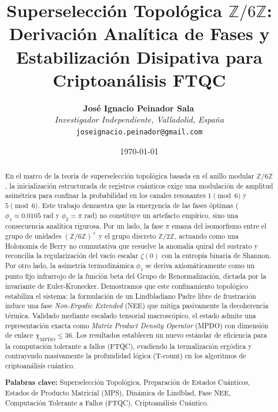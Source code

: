 \documentclass[12pt,a4paper]{article}
\theoremstyle{plain}
\theoremstyle{definition}
\theoremstyle{remark}
\begin{document}
\title{Superselección Topológica $\mathbb{Z}/6\mathbb{Z}$: Derivación Analítica de Fases y Estabilización Disipativa para Criptoanálisis FTQC}

\author{
  \textbf{José Ignacio Peinador Sala}\, \\
  \textit{Investigador Independiente, Valladolid, España} \\
  \texttt{joseignacio.peinador@gmail.com}
}

\date{\today}
\maketitle

\begin{abstract}
En el marco de la teoría de superselección topológica basada en el anillo modular $\mathbb{Z}/6\mathbb{Z}$, la inicialización estructurada de registros cuánticos exige una modulación de amplitud asimétrica para confinar la probabilidad en los canales resonantes $1 \pmod 6$ y $5 \pmod 6$. Este trabajo demuestra que la emergencia de las fases óptimas ($\phi_1 \approx 0.0105$ rad y $\phi_2 = \pi$ rad) no constituye un artefacto empírico, sino una consecuencia analítica rigurosa. Por un lado, la fase $\pi$ emana del isomorfismo entre el grupo de unidades $(\mathbb{Z}/6\mathbb{Z})^{\times}$ y el grupo discreto $\mathbb{Z}/2\mathbb{Z}$, actuando como una Holonomía de Berry no conmutativa que resuelve la anomalía quiral del sustrato y reconcilia la regularización del vacío escalar $\zeta(0)$ con la entropía binaria de Shannon. Por otro lado, la asimetría termodinámica $\phi_1$ se deriva axiomáticamente como un punto fijo infrarrojo de la función beta del Grupo de Renormalización, dictada por la invariante de Euler-Kronecker. Demostramos que este confinamiento topológico estabiliza el sistema: la formulación de un Lindbladiano Padre libre de frustración induce una fase \textit{Non-Ergodic Extended} (NEE) que mitiga pasivamente la decoherencia térmica. Validado mediante escalado tensorial macroscópico, el estado admite una representación exacta como \textit{Matrix Product Density Operator} (MPDO) con dimensión de enlace $\chi_{\text{MPDO}} \le 36$. Los resultados establecen un nuevo estándar de eficiencia para la computación tolerante a fallos (FTQC), evadiendo la termalización ergódica y contrayendo masivamente la profundidad lógica (T-count) en los algoritmos de criptoanálisis cuántico.

\vspace{0.5cm}
\noindent \textbf{Palabras clave:} Superselección Topológica, Preparación de Estados Cuánticos, Estados de Producto Matricial (MPS), Dinámica de Lindblad, Fase NEE, Computación Tolerante a Fallos (FTQC), Criptoanálisis Cuántico.
\end{abstract}
\end{document}
